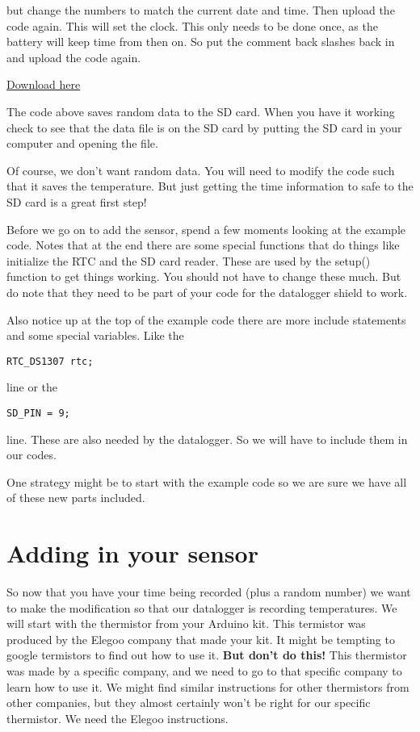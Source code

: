     \noindent but change the numbers to match the current date and time. Then upload the code again. This will set the clock. This only needs to be done once, as the battery will keep time from then on. So put the comment back slashes back in and upload the code again.

\href{https://raw.githubusercontent.com/rtlines/IntermediateLabPH250/main/Code/DataLog.ino}{Download here}
    


The code above saves random data to the SD card. When you have it working check to see that the data file is on the SD card by putting the SD card in your computer and opening the file.  

Of course, we don't want random data. You will need to modify the code such that it saves the temperature. But just getting the time information to safe to the SD card is a great first step!

Before we go on to add the sensor, spend a few moments looking at the example code.  Notes that at the end there are some special functions that do things like initialize the RTC and the SD card reader.  These are used by the setup() function to get things working. You should not have to change these much.  But do note that they need to be part of your code for the datalogger shield to work.

Also notice up at the top of the example code there are more include statements and some special variables.  Like the 

 \begin{lstlisting}[language=Arduino]
	RTC_DS1307 rtc;
\end{lstlisting}
line or the 
 \begin{lstlisting}[language=Arduino]
	SD_PIN = 9; 
\end{lstlisting}
line. These are also needed by the datalogger. So we will have to include them in our codes. 

One strategy might be to start with the example code so we are sure we have all of these new parts included.

\section{Adding in your sensor}
So now that you have your time being recorded (plus a random number) we want to make the modification so that our datalogger is recording temperatures.  We will start with the thermistor from your Arduino kit. This termistor was produced by the Elegoo company that made your kit.  It might be tempting to google termistors to find out how to use it. \textbf{But don't do this! } This thermistor was made by a specific company, and we need to go to that specific company to learn how to use it.  We might find similar instructions for other thermistors from other companies, but they almost certainly won't be right for our specific thermistor.  We need the Elegoo instructions. 


